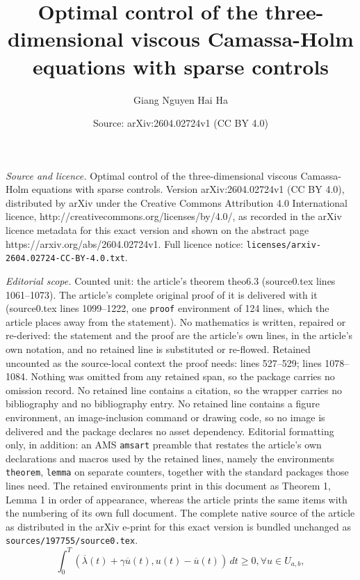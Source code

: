 \documentclass[10pt,a4paper]{amsart}
\title{Optimal control of the three-dimensional viscous Camassa-Holm equations with sparse controls}
\author{Giang Nguyen Hai Ha}
\date{Source: arXiv:2604.02724v1 (CC BY 4.0)}
\begin{document}
\maketitle

\noindent\emph{Source and licence.} Optimal control of the three-dimensional viscous Camassa-Holm equations with sparse controls. Version arXiv:2604.02724v1 (CC BY 4.0), distributed by arXiv under the Creative Commons Attribution 4.0 International licence, http://creativecommons.org/licenses/by/4.0/, as recorded in the arXiv licence metadata for this exact version and shown on the abstract page https://arxiv.org/abs/2604.02724v1. Full licence notice: \texttt{licenses/arxiv-2604.02724-CC-BY-4.0.txt}.\par\smallskip

\noindent\textit{Editorial scope.} Counted unit: the article's theorem theo6.3 (source0.tex lines 1061--1073). The article's complete original proof of it is delivered with it (source0.tex lines 1099--1222, one \texttt{proof} environment of 124 lines, which the article places away from the statement). No mathematics is written, repaired or re-derived: the statement and the proof are the article's own lines, in the article's own notation, and no retained line is substituted or re-flowed.  Retained uncounted as the source-local context the proof needs: lines 527--529; lines 1078--1084.  Nothing was omitted from any retained span, so the package carries no omission record.  No retained line contains a citation, so the wrapper carries no bibliography and no bibliography entry.  No retained line contains a figure environment, an image-inclusion command or drawing code, so no image is delivered and the package declares no asset dependency.  Editorial formatting only, in addition: an AMS \texttt{amsart} preamble that restates the article's own declarations and macros used by the retained lines, namely the environments \texttt{theorem}, \texttt{lemma} on separate counters, together with the standard packages those lines need.  The retained environments print in this document as Theorem 1, Lemma 1 in order of appearance, whereas the article prints the same items with the numbering of its own full document.  The complete native source of the article as distributed in the arXiv e-print for this exact version is bundled unchanged as \texttt{sources/197755/source0.tex}.
		\begin{equation} \label{4.3}
			\int_{0}^{T} \left( \overline{\lambda}(t)+\gamma \overline{u}(t),u(t)-\overline{u}(t) \right)\,dt \ge 0, \forall u \in U_{a,b},
		\end{equation}
\end{document}
